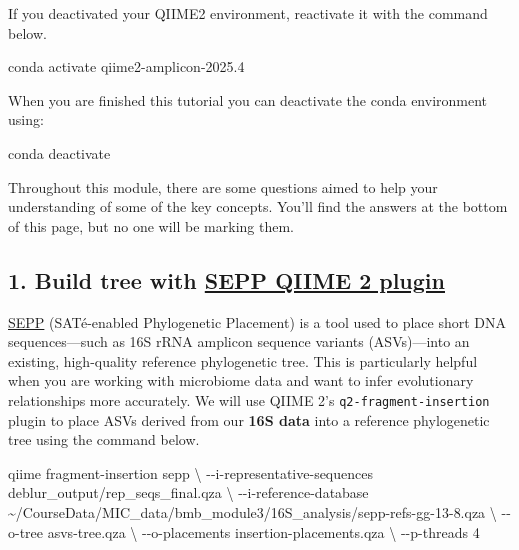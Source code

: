 \documentclass[
]{book}
\newenvironment{Shaded}{\begin{snugshade}}{\end{snugshade}}
\newcommand{\AttributeTok}[1]{\textcolor[rgb]{0.13,0.29,0.53}{#1}}
\newcommand{\DataTypeTok}[1]{\textcolor[rgb]{0.13,0.29,0.53}{#1}}
\newcommand{\ExtensionTok}[1]{#1}
\newcommand{\NormalTok}[1]{#1}
\begin{document}
If you deactivated your QIIME2 environment, reactivate it with the command below.

\begin{Shaded}
\begin{Highlighting}[]
\ExtensionTok{conda}\NormalTok{ activate qiime2{-}amplicon{-}2025.4}
\end{Highlighting}
\end{Shaded}

When you are finished this tutorial you can deactivate the conda environment using:

\begin{Shaded}
\begin{Highlighting}[]
\ExtensionTok{conda}\NormalTok{ deactivate}
\end{Highlighting}
\end{Shaded}

Throughout this module, there are some questions aimed to help your understanding of some of the key concepts. You'll find the answers at the bottom of this page, but no one will be marking them.

\subsection{\texorpdfstring{1. Build tree with \protect\hypertarget{build-tree}{}\href{https://amplicon-docs.qiime2.org/en/latest/references/plugins/fragment-insertion.html\#q2-plugin-fragment-insertion}{SEPP QIIME 2 plugin}}{1. Build tree with SEPP QIIME 2 plugin}}\label{build-tree-with-sepp-qiime-2-plugin}

\href{https://www.ncbi.nlm.nih.gov/pmc/articles/PMC5904434/}{SEPP} (SATé-enabled Phylogenetic Placement) is a tool used to place short DNA sequences---such as 16S rRNA amplicon sequence variants (ASVs)---into an existing, high-quality reference phylogenetic tree. This is particularly helpful when you are working with microbiome data and want to infer evolutionary relationships more accurately. We will use QIIME 2's \texttt{q2-fragment-insertion} plugin to place ASVs derived from our \textbf{16S data} into a reference phylogenetic tree using the command below.

\begin{Shaded}
\begin{Highlighting}[]
\ExtensionTok{qiime}\NormalTok{ fragment{-}insertion sepp }\DataTypeTok{\textbackslash{}}
  \AttributeTok{{-}{-}i{-}representative{-}sequences}\NormalTok{ deblur\_output/rep\_seqs\_final.qza }\DataTypeTok{\textbackslash{}}
  \AttributeTok{{-}{-}i{-}reference{-}database}\NormalTok{ \textasciitilde{}/CourseData/MIC\_data/bmb\_module3/16S\_analysis/sepp{-}refs{-}gg{-}13{-}8.qza }\DataTypeTok{\textbackslash{}}
  \AttributeTok{{-}{-}o{-}tree}\NormalTok{ asvs{-}tree.qza }\DataTypeTok{\textbackslash{}}
  \AttributeTok{{-}{-}o{-}placements}\NormalTok{ insertion{-}placements.qza }\DataTypeTok{\textbackslash{}}
  \AttributeTok{{-}{-}p{-}threads}\NormalTok{ 4}
\end{Highlighting}
\end{Shaded}
\end{document}
